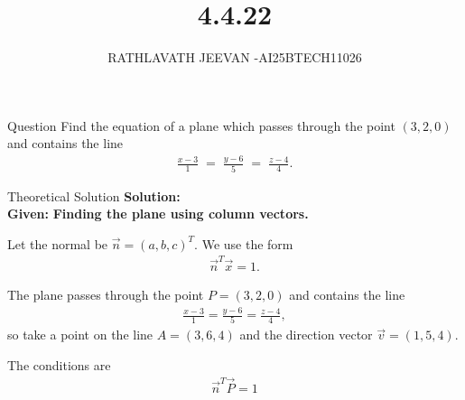 \documentclass{beamer}
\title %
{4.4.22}
\author %
{RATHLAVATH JEEVAN -AI25BTECH11026}
\begin{document}
\frame{\titlepage}
\begin{frame}{Question}
Find the equation of a plane which passes through the point $(3,2,0)$ and contains the line
\begin{align}
\frac{x-3}{1} \;=\; \frac{y-6}{5} \;=\; \frac{z-4}{4}.
 \end{align}
\end{frame}
\begin{frame}{Theoretical Solution}
\textbf{Solution:}\\
 \textbf{Given:}  
\textbf{Finding the plane using column vectors.}


Let the normal be \(\vec{n}=(a,b,c)^T\). We use the form
\begin{align}
\vec{n}^T\vec{x}=1.
\end{align}

The plane passes through the point \(P=(3,2,0)\) and contains the line
\begin{align}
\frac{x-3}{1}=\frac{y-6}{5}=\frac{z-4}{4},
\end{align}
so take a point on the line \(A=(3,6,4)\) and the direction vector
\(\vec{v}=(1,5,4)\).

The conditions are
\begin{align}
\vec{n}^T \vec{P} = 1
\end{align}
\end{frame}
\end{document}
